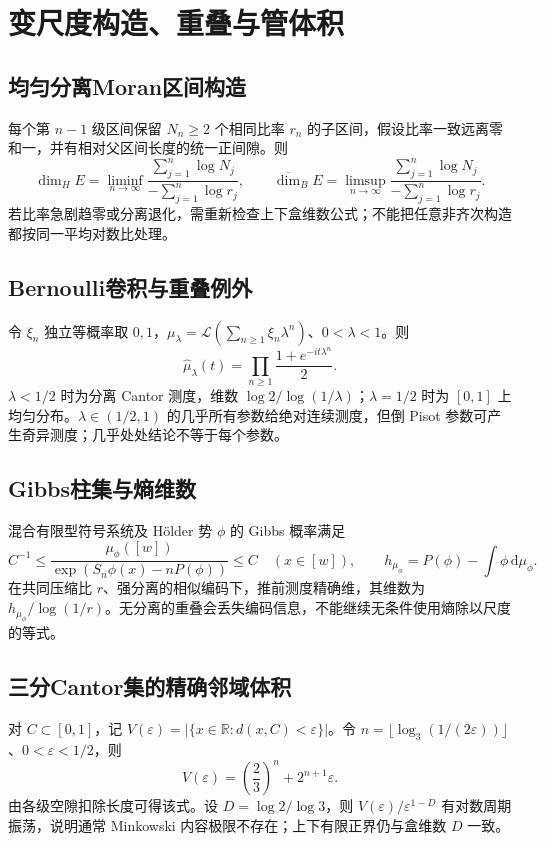 \documentclass[../main.tex]{subfiles}
\begin{document}
\section{变尺度构造、重叠与管体积}
\subsection{均匀分离Moran区间构造}
每个第 $n-1$ 级区间保留 $N_n\ge2$ 个相同比率 $r_n$ 的子区间，假设比率一致远离零和一，并有相对父区间长度的统一正间隙。则
\[
\dim_HE=\liminf_{n\to\infty}\frac{\sum_{j=1}^n\log N_j}{-\sum_{j=1}^n\log r_j},\qquad
\overline{\dim}_BE=\limsup_{n\to\infty}\frac{\sum_{j=1}^n\log N_j}{-\sum_{j=1}^n\log r_j}.
\]
若比率急剧趋零或分离退化，需重新检查上下盒维数公式；不能把任意非齐次构造都按同一平均对数比处理。
\subsection{Bernoulli卷积与重叠例外}
令 $\xi_n$ 独立等概率取 $0,1$，$\mu_\lambda=\mathcal L(\sum_{n\ge1}\xi_n\lambda^n)$、$0<\lambda<1$。则
\[
\widehat\mu_\lambda(t)=\prod_{n\ge1}\frac{1+e^{-it\lambda^n}}2.
\]
$\lambda<1/2$ 时为分离 Cantor 测度，维数 $\log2/\log(1/\lambda)$；$\lambda=1/2$ 时为 $[0,1]$ 上均匀分布。$\lambda\in(1/2,1)$ 的几乎所有参数给绝对连续测度，但倒 Pisot 参数可产生奇异测度；几乎处处结论不等于每个参数。
\subsection{Gibbs柱集与熵维数}
混合有限型符号系统及 Hölder 势 $\phi$ 的 Gibbs 概率满足
\[
C^{-1}\le\frac{\mu_\phi([w])}{\exp(S_n\phi(x)-nP(\phi))}\le C
\quad(x\in[w]),\qquad
h_{\mu_\phi}=P(\phi)-\int\phi\,\mathrm d\mu_\phi.
\]
在共同压缩比 $r$、强分离的相似编码下，推前测度精确维，其维数为 $h_{\mu_\phi}/\log(1/r)$。无分离的重叠会丢失编码信息，不能继续无条件使用熵除以尺度的等式。
\subsection{三分Cantor集的精确邻域体积}
对 $C\subset[0,1]$，记 $V(\varepsilon)=|\{x\in\mathbb R:d(x,C)<\varepsilon\}|$。令 $n=\lfloor\log_3(1/(2\varepsilon))\rfloor$、$0<\varepsilon<1/2$，则
\[
V(\varepsilon)=\left(\frac23\right)^n+2^{n+1}\varepsilon.
\]
由各级空隙扣除长度可得该式。设 $D=\log2/\log3$，则 $V(\varepsilon)/\varepsilon^{1-D}$ 有对数周期振荡，说明通常 Minkowski 内容极限不存在；上下有限正界仍与盒维数 $D$ 一致。
\end{document}
